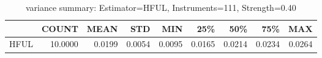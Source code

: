 \begin{table}[ht]
\centering
\caption{variance summary: Estimator=HFUL, Instruments=111, Strength=0.40}
\begin{tabular}{lrrrrrrrr}
\toprule
 & COUNT & MEAN & STD & MIN & 25\% & 50\% & 75\% & MAX \\
\midrule
HFUL & 10.0000 & 0.0199 & 0.0054 & 0.0095 & 0.0165 & 0.0214 & 0.0234 & 0.0264 \\
\bottomrule
\end{tabular}
\end{table}
